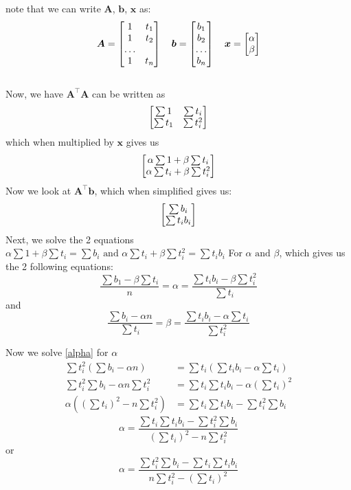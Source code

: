 \documentclass[answers,10pt]{exam}
\newcommand{\B}[1]{\boldsymbol{#1}}
\begin{document}
\begin{questions}
\begin{solution}
    note that we can write $\B{A}$, $\B{b}$, $\B{x}$ as: \[\B{A} = \bmat{ 1 & t_1 \\ 1 & t_2 \\ \dots \\ 1 & t_n}\quad \B{b} = \bmat{b_1 \\ b_2 \\ \dots \\ b_n} \quad \B{x} = \bmat{\alpha \\ \beta}\] \\ 
    Now, we have  $\B{A}^{\top}\B{A}$ can be written as \[ \begin{bmatrix} \sum{1} & \sum{t_i} \\ \sum{t_1} & \sum{t_i^2}\end{bmatrix} \] which when multiplied by $\B{x}$ gives us \[ \begin{bmatrix}\alpha \sum{1} + \beta \sum{t_i} \\ \alpha \sum{t_i} + \beta \sum{t_i^2}\end{bmatrix} \]
    Now we look at $\B{A}^\top \B{b}$, which when simplified gives us: 
    \[ \begin{bmatrix}\sum{b_i} \\ \sum{t_i b_i}\end{bmatrix}  \]
    Next, we solve the 2 equations 
    $\alpha \sum{1} + \beta \sum{t_i} = \sum{b_i}  \text{ and }
    \alpha \sum{t_i} + \beta \sum{t_i^2} = \sum{t_i b_i} $ For $\alpha \text{ and } \beta$, which gives us the 2 following equations: 
    \begin{equation} \label{beta}
        \dfrac{\sum{b_1} - \beta \sum{t_i}}{n} = \alpha = \dfrac{\sum{t_i b_i} - \beta \sum{t_i^2}}{\sum{t_i}}
    \end{equation}
    and 
    \begin{equation} \label{alpha}
        \dfrac{\sum{b_i} - \alpha n}{\sum{t_i}} = \beta = \dfrac{\sum{t_i b_i} - \alpha \sum{t_i}}{\sum{t_i^2}}
    \end{equation}
    
    Now we solve \ref{alpha} for $\alpha$
    \begin{align*}
        \sum{t_i^2}(\sum{b_i} - \alpha n) &= \sum{t_i}(\sum{t_i b_i} - \alpha \sum{t_i}) \\
        \sum{t_i^2} \sum{b_i} -  \alpha n \sum{t_i^2} &= \sum{t_i} \sum{t_i b_i} -  \alpha (\sum{t_i})^2 \\
        \alpha((\sum{t_i})^2 - n\sum{t_i^2}) &= \sum{t_i} \sum{t_i b_i} - \sum{t_i^2} \sum{b_i}
    \end{align*}
    $$
    \alpha = \dfrac{\sum{t_i} \sum{t_i b_i} - \sum{t_i^2} \sum{b_i}}{(\sum{t_i})^2 - n\sum{t_i^2}}
    $$
    or
    $$
    \alpha = \dfrac{\sum{t_i^2} \sum{b_i} - \sum{t_i} \sum{t_i b_i}}{n\sum{t_i^2} - (\sum{t_i})^2}
    $$
    

\end{solution}
\end{questions}
\end{document}
